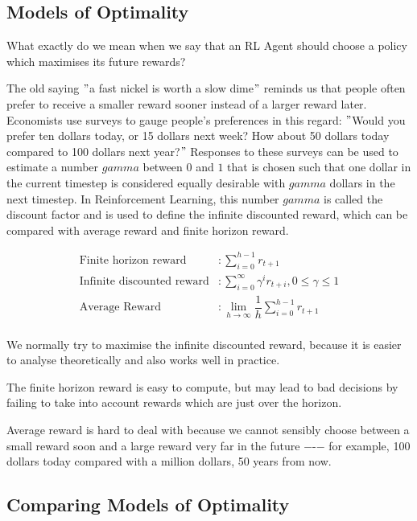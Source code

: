 \documentclass[11pt]{article}
\begin{document}
\subsection{Models of Optimality}\label{subsec:models-of-optimality}
What exactly do we mean when we say that an RL Agent should choose a policy
which maximises its future rewards?

The old saying \("\)a fast nickel is worth a slow dime\("\) reminds us that people
often prefer to receive a smaller reward sooner instead of a larger reward
later.
Economists use surveys to gauge people's preferences in this regard: \("\)Would
you prefer ten dollars today, or 15 dollars next week?
How about 50 dollars today compared to 100 dollars next year?\("\) Responses
to these surveys can be used to estimate a number $gamma$ between $0$ and $1$
that is chosen such that one dollar in the current timestep is considered
equally desirable with $gamma$ dollars in the next timestep.
In Reinforcement Learning, this number $gamma$ is called the discount factor
and is used to define the infinite discounted reward, which can be compared
with average reward and finite horizon reward.

\[
\begin{aligned}
    \text{Finite horizon reward} &: \sum_{i=0}^{h-1} r_{t+1} \\
    \text{Infinite discounted reward} &: \sum_{i=0}^{\infty} \gamma^i r_{t+i}, 0 \leq \gamma \leq 1\\
    \text{Average Reward} &: \lim_{h \to \infty} \dfrac{1}{h} \sum_{i=0}^{h-1} r_{t+1} \\
\end{aligned}
\]

We normally try to maximise the infinite discounted reward, because it is
easier to analyse theoretically and also works well in practice.

The finite horizon reward is easy to compute, but may lead to bad decisions by
failing to take into account rewards which are just over the horizon.

 Average reward is hard to deal with because we cannot sensibly choose between
a small reward soon and a large reward very far in the future −-− for example,
100 dollars today compared with a million dollars, 50 years from now.

\subsection{Comparing Models of Optimality}\label{subsec:comparing-models-of-optimality}
\end{document}
